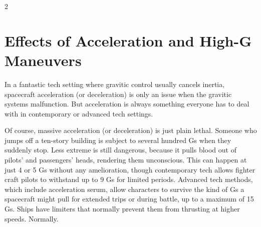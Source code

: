 \begin{multicols}{2}

\section{Effects of Acceleration and High-G Maneuvers}

In a fantastic tech setting where gravitic control usually cancels inertia, spacecraft acceleration (or deceleration) is only an issue when the gravitic systems malfunction. But acceleration is always something everyone has to deal with in contemporary or advanced tech settings.

Of course, massive acceleration (or deceleration) is just plain lethal. Someone who jumps off a ten-story building is subject to several hundred Gs when they suddenly stop. Less extreme is still dangerous, because it pulls blood out of pilots’ and passengers’ heads, rendering them unconscious. This can happen at just 4 or 5 Gs without any amelioration, though contemporary tech allows fighter craft pilots to withstand up to 9 Gs for limited periods. Advanced tech methods, which include acceleration serum, allow characters to survive the kind of Gs a spacecraft might pull for extended trips or during battle, up to a maximum of 15 Gs. Ships have limiters that normally prevent them from thrusting at higher speeds. Normally.

\end{multicols}

